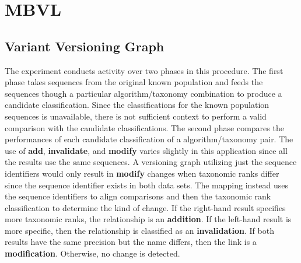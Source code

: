 \section{MBVL}


\subsection{Variant Versioning Graph}

The experiment conducts activity over two phases in this procedure.
The first phase takes sequences from the original known population and feeds the sequences though a particular algorithm/taxonomy combination to produce a candidate classification.
Since the classifications for the known population sequences is unavailable, there is not sufficient context to perform a valid comparison with the candidate classifications.
The second phase compares the performances of each candidate classification of a algorithm/taxonomy pair.
The use of \textbf{add}, \textbf{invalidate}, and \textbf{modify} varies slightly in this application since all the results use the same sequences.
A versioning graph utilizing just the sequence identifiers would only result in \textbf{modify} changes when taxonomic ranks differ since the sequence identifier exists in both data sets.
The mapping instead uses the sequence identifiers to align comparisons and then the taxonomic rank classification to determine the kind of change.
If the right-hand result specifies more taxonomic ranks, the relationship is an \textbf{addition}.
If the left-hand result is more specific, then the relationship is classified as an \textbf{invalidation}.
If both results have the same precision but the name differs, then the link is a \textbf{modification}.
Otherwise, no change is detected.

